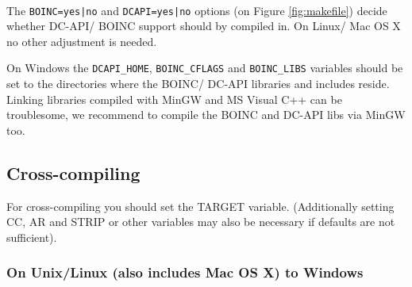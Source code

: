 \documentclass[a4paper,12pt,titlepage,dvipdfm]{article}
\begin{document}
\paragraph*{}The \texttt{BOINC=yes|no} and \texttt{DCAPI=yes|no} options (on Figure \ref{fig:makefile}) decide whether DC-API/ BOINC support should by compiled in. On Linux/ Mac OS X no other adjustment is needed. 

On Windows the \texttt{DCAPI\_HOME}, \texttt{BOINC\_CFLAGS} and \texttt{BOINC\_LIBS} variables should be set to the directories where the BOINC/ DC-API libraries and includes reside. Linking libraries compiled with MinGW and MS Visual C++ can be troublesome, we recommend to compile the BOINC and DC-API libs via MinGW too.

\subsection{Cross-compiling}


For cross-compiling you should set the TARGET variable. (Additionally setting CC, AR and STRIP or other variables may also be necessary if defaults are not sufficient). 

\subsubsection{On Unix/Linux (also includes Mac OS X) to Windows}
\end{document}
